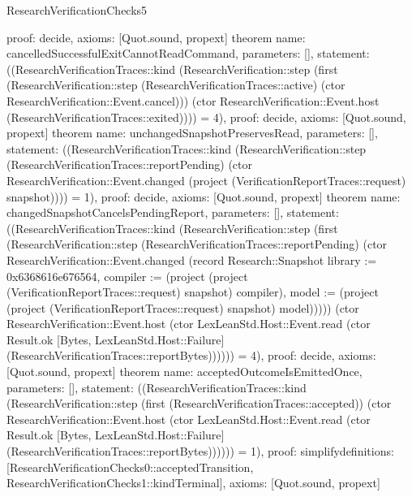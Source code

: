 \begin{lexlean}{ResearchVerificationChecks5}
\begin{semanticmodule}
{  proof: decide{},
  axioms: [Quot.sound, propext]
}
theorem{
  name: cancelledSuccessfulExitCannotReadCommand,
  parameters: [],
  statement: ((ResearchVerificationTraces::kind (ResearchVerification::step (first (ResearchVerification::step (ResearchVerificationTraces::active) (ctor ResearchVerification::Event.cancel))) (ctor ResearchVerification::Event.host (ResearchVerificationTraces::exited)))) = 4),
  proof: decide{},
  axioms: [Quot.sound, propext]
}
theorem{
  name: unchangedSnapshotPreservesRead,
  parameters: [],
  statement: ((ResearchVerificationTraces::kind (ResearchVerification::step (ResearchVerificationTraces::reportPending) (ctor ResearchVerification::Event.changed (project (VerificationReportTraces::request) snapshot)))) = 1),
  proof: decide{},
  axioms: [Quot.sound, propext]
}
theorem{
  name: changedSnapshotCancelsPendingReport,
  parameters: [],
  statement: ((ResearchVerificationTraces::kind (ResearchVerification::step (first (ResearchVerification::step (ResearchVerificationTraces::reportPending) (ctor ResearchVerification::Event.changed (record Research::Snapshot {library := 0x6368616e676564, compiler := (project (project (VerificationReportTraces::request) snapshot) compiler), model := (project (project (VerificationReportTraces::request) snapshot) model)})))) (ctor ResearchVerification::Event.host (ctor LexLeanStd.Host::Event.read (ctor Result.ok [Bytes, LexLeanStd.Host::Failure] (ResearchVerificationTraces::reportBytes)))))) = 4),
  proof: decide{},
  axioms: [Quot.sound, propext]
}
theorem{
  name: acceptedOutcomeIsEmittedOnce,
  parameters: [],
  statement: ((ResearchVerificationTraces::kind (ResearchVerification::step (first (ResearchVerificationTraces::accepted)) (ctor ResearchVerification::Event.host (ctor LexLeanStd.Host::Event.read (ctor Result.ok [Bytes, LexLeanStd.Host::Failure] (ResearchVerificationTraces::reportBytes)))))) = 1),
  proof: simplify{definitions: [ResearchVerificationChecks0::acceptedTransition, ResearchVerificationChecks1::kindTerminal]},
  axioms: [Quot.sound, propext]
}
\end{semanticmodule}
\end{lexlean}
